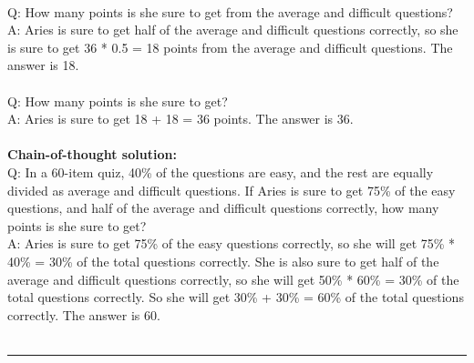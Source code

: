  \\
Q: How many points is she sure to get from the average and difficult questions? \\
A: Aries is sure to get half of the average and difficult questions correctly, so she is sure to get 36 * 0.5 = 18 points from the average and difficult questions. The answer is 18. \\
 \\
Q: How many points is she sure to get? \\
A: Aries is sure to get 18 + 18 = 36 points. The answer is 36. \\
 \\
\textbf{Chain-of-thought solution:} \\
Q: In a 60-item quiz, 40\% of the questions are easy, and the rest are equally divided as average and difficult questions. If Aries is sure to get 75\% of the easy questions, and half of the average and difficult questions correctly, how many points is she sure to get? \\
A: Aries is sure to get 75\% of the easy questions correctly, so she will get 75\% * 40\% = 30\% of the total questions correctly. She is also sure to get half of the average and difficult questions correctly, so she will get 50\% * 60\% = 30\% of the total questions correctly. So she will get 30\% + 30\% = 60\% of the total questions correctly. The answer is 60. \\
 \\
\hrule \bigskip

